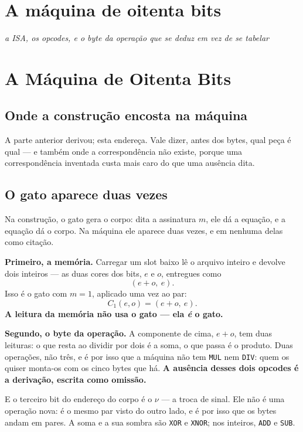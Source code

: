 \documentclass[11pt]{article}
\newcommand{\code}[1]{\texttt{\small #1}}
\theoremstyle{plain}
\theoremstyle{remark}
\begin{document}
\section{A máquina de oitenta bits}

\noindent\emph{a ISA, os opcodes, e o byte da operação que se deduz em vez de se tabelar}

\section{A Máquina de Oitenta Bits}

\subsection{Onde a construção encosta na máquina}

A parte anterior derivou; esta endereça. Vale dizer, antes dos bytes, qual peça
é qual --- e também onde a correspondência não existe, porque uma
correspondência inventada custa mais caro do que uma ausência dita.

\subsection{O gato aparece duas vezes}

Na construção, o gato gera o corpo: dita a assinatura $m$, ele dá a equação, e a
equação dá o corpo. Na máquina ele aparece duas vezes, e em nenhuma delas como
citação.

\textbf{Primeiro, a memória.} Carregar um slot baixo lê o arquivo inteiro e
devolve dois inteiros --- as duas cores dos bits, $e$ e $o$, entregues como
\[
(e+o,\ e).
\]
Isso é o gato com $m=1$, aplicado uma vez ao par:
\[
C_1(e,o)=(e+o,\ e).
\]
\textbf{A leitura da memória não usa o gato --- ela \emph{é} o gato.}

\textbf{Segundo, o byte da operação.} A componente de cima, $e+o$, tem duas
leituras: o que resta ao dividir por dois é a soma, o que passa é o produto.
Duas operações, não três, e é por isso que a máquina não tem \code{MUL} nem
\code{DIV}: quem os quiser monta-os com os cinco bytes que há. \textbf{A ausência
desses dois opcodes é a derivação, escrita como omissão.}

E o terceiro bit do endereço do corpo é o $\nu$ --- a troca de sinal. Ele não é
uma operação nova: é o mesmo par visto do outro lado, e é por isso que os bytes
andam em pares. A soma e a sua sombra são \code{XOR} e \code{XNOR}; nos inteiros,
\code{ADD} e \code{SUB}.
\end{document}

